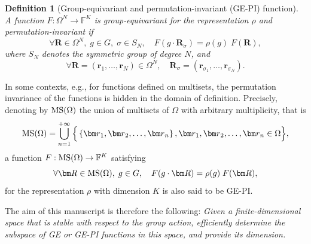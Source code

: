 \documentclass{article}
\newtheorem{definition}[theorem]{Definition}
\numberwithin{equation}{section}
\def\F{\mathbb{F}}
\def\br{{\bm r}}
\def\bR{{\bm R}}
\def\Nat{{N}}
\begin{document}
\begin{definition}[Group-equivariant and permutation-invariant (GE-PI) function]
\label{def:GEPI}
A function $F: \Omega^\Nat \rightarrow \F^K$ is group-equivariant for the representation $\rho$
and permutation-invariant if
\begin{equation}\label{eq:GE-PI}
  \forall \bR \in \Omega^\Nat, \; g \in G, \; \sigma \in S_\Nat, \quad   F(g \cdot \bR_\sigma) = \rho(g) \; F(\bR),
\end{equation}
where $S_\Nat$ denotes the symmetric group of degree $\Nat$, and
\[
    \forall \bR = (\br_1,\ldots,\br_\Nat) \in \Omega^\Nat, 
    \quad 
    \bR_\sigma = (\br_{\sigma_1},\ldots,\br_{\sigma_\Nat}).
\]
\end{definition}

In some contexts, e.g., for functions defined on multisets, the permutation invariance of the functions is hidden in the domain of definition. Precisely, denoting by $\textup{MS}(\Omega)$ the union of multisets of $\Omega$ with arbitrary multiplicity, that is 
\[
    \textup{MS}(\Omega) 
    = \bigcup_{n=1}^{+\infty} 
    \Big\{ 
    \left\{ 
    \br_1, \br_2, \ldots, \br_n
    \right\}, 
    \br_1,\br_2,\ldots, \br_n \in \Omega
    \Big\},
\]
a function $F:\textup{MS}(\Omega)\to\F^K$ satisfying
\[
    \forall \bR \in \textup{MS}(\Omega), \;  g \in G,  \quad   F(g \cdot \bR) = \rho(g) \; F(\bR),
\]
for the representation $\rho$ with dimension $K$ is also said to be GE-PI.


The aim of this manuscript is therefore the following: \textit{Given a finite-dimensional space that is stable with respect to the group action, efficiently determine the subspace of GE or GE-PI functions in this space, and provide its dimension.}
\end{document}
